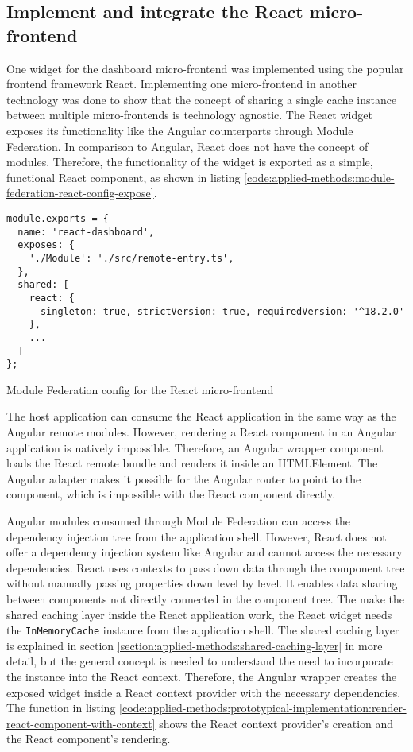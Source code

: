 \subsection{Implement and integrate the React micro-frontend}

One widget for the dashboard micro-frontend was implemented using the popular frontend framework React. Implementing one micro-frontend in another technology was done to show that the concept of sharing a single cache instance between multiple micro-frontends is technology agnostic. The React widget exposes its functionality like the Angular counterparts through Module Federation. In comparison to Angular, React does not have the concept of modules. Therefore, the functionality of the widget is exported as a simple, functional React component, as shown in listing  \ref{code:applied-methods:module-federation-react-config-expose}.

\ifshowListings
\begin{listing}[H]
    \begin{verbatim}
module.exports = {
  name: 'react-dashboard',
  exposes: {
    './Module': './src/remote-entry.ts',
  },
  shared: [
    react: {
      singleton: true, strictVersion: true, requiredVersion: '^18.2.0' 
    },
    ...
  ]
};
    \end{verbatim}
    \caption{Module Federation config for the React micro-frontend}\label{code:applied-methods:module-federation-react-config-expose}
\end{listing}
\fi

\noindent The host application can consume the React application in the same way as the Angular remote modules. However, rendering a React component in an Angular application is natively impossible. Therefore, an Angular wrapper component loads the React remote bundle and renders it inside an HTMLElement. The Angular adapter makes it possible for the Angular router to point to the component, which is impossible with the React component directly.

\bigskip

\noindent Angular modules consumed through Module Federation can access the dependency injection tree from the application shell. However, React does not offer a dependency injection system like Angular and cannot access the necessary dependencies. React uses contexts to pass down data through the component tree without manually passing properties down level by level. It enables data sharing between components not directly connected in the component tree. The make the shared caching layer inside the React application work, the React widget needs the \texttt{InMemoryCache} instance from the application shell. The shared caching layer is explained in section \ref{section:applied-methods:shared-caching-layer} in more detail, but the general concept is needed to understand the need to incorporate the instance into the React context. Therefore, the Angular wrapper creates the exposed widget inside a React context provider with the necessary dependencies. The function in listing \ref{code:applied-methods:prototypical-implementation:render-react-component-with-context} shows the React context provider's creation and the React component's rendering. 


